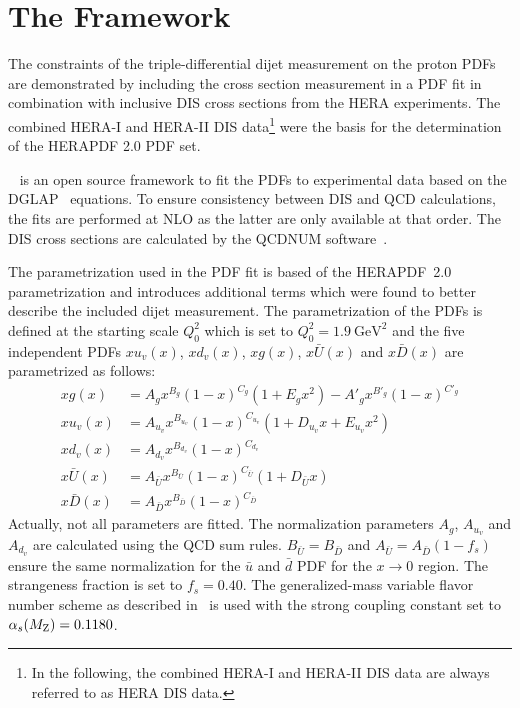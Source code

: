 \section{The \xfitter Framework}
\label{section:herafittersetup}

The constraints of the triple-differential dijet measurement on the proton PDFs
are demonstrated by including the cross section measurement in a PDF fit in
combination with inclusive DIS cross sections from the HERA experiments. The
combined HERA-I and HERA-II DIS data\footnote{In the following, the combined
HERA-I and HERA-II DIS data are always referred to as HERA DIS data.} were the
basis for the determination of the HERAPDF 2.0 PDF set.

\xfitter~\cite{Alekhin:2014irh} is an open source framework to fit the PDFs to experimental data based
on the DGLAP~\cite{Gribov:1972ri,Altarelli:1977zs,Dokshitzer:1977sg} equations.
To ensure consistency between DIS and QCD calculations, the fits are performed
at NLO as the latter are only available at that order. The DIS cross sections
are calculated by the QCDNUM software~\cite{Botje:2010ay}.

The parametrization used in the PDF fit is based of the
HERAPDF~2.0~\cite{Abramowicz:2015mha} parametrization and introduces additional
terms which were found to better describe the included dijet
measurement. The parametrization of the PDFs is defined at the starting scale
$Q_0^2$
which is set to $Q_0^2 = \SI{1.9}{\GeV \squared}$ and the five independent PDFs
$xu_v(x)$, $xd_v(x)$, $xg(x)$, $x\bar{U}(x)$ and $x\bar{D}(x)$ are parametrized
as follows:
%
\begin{align*}
  xg(x) &= A_g x^{B_g} (1-x)^{C_g} (1 + E_g x^2) - A'_g x^{B'_g} (1-x)^{C'_g} \\
  xu_v(x) &= A_{u_{v}} x^{B_{u_{v}}} (1-x)^{C_{u_{v}}}(1 + D_{u_{v}}x + E_{u_{v}}x^2)\\
  xd_v(x) &= A_{d_v} x^{B_{d_v}} (1-x)^{C_{d_{v}}}\\
  x\bar U(x) &= A_{\bar U} x^{B_{\bar U}} (1-x)^{C_{\bar U}}(1 + D_{\bar U}x)\\
  x\bar D(x) &= A_{\bar D} x^{B_{\bar D}} (1-x)^{C_{\bar D}}
\end{align*}
%
Actually, not all parameters are fitted. The normalization parameters $A_g$,
$A_{u_{v}}$ and $A_{d_{v}}$ are calculated using the QCD sum rules. $B_{\bar
U}=B_{\bar D}$ and $A_{\bar U} = A_{\bar D}(1-f_s)$ ensure the same
normalization for the $\bar u$ and $\bar d$ PDF for the $x \rightarrow 0$
region. The strangeness fraction is set to $f_s = 0.40$. The generalized-mass
variable flavor number scheme as described in~\cite{Thorne:1997ga,Thorne:2006qt}
is used with the strong coupling constant set to $\alpha_{s}(M_\mathrm{Z})= 0.1180$.


